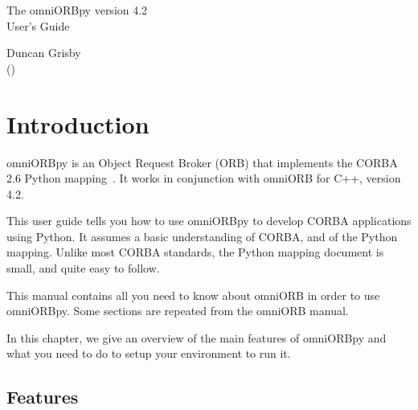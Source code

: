 \documentclass[11pt,oneside,a4paper]{book}
\begin{document}
\pagestyle{empty}


\begin{center}

\vfill

{ \Huge
The omniORBpy version 4.2\\[4mm]
User's Guide
}

\vfill

{ \Large
Duncan Grisby\\
{\normalsize (\textit{\href{mailto:dgrisby@apasphere.com}%
                           {}})}%
                           \\[2ex]
}

\vfill

\end{center}

\cleardoublepage

\tableofcontents

\cleardoublepage

\pagestyle{headings}


\mainmatter


\chapter{Introduction}

omniORBpy is an Object Request Broker (ORB) that implements the CORBA
2.6 Python mapping~\cite{pythonmapping}. It works in conjunction with
omniORB for C++, version 4.2.

This user guide tells you how to use omniORBpy to develop CORBA
applications using Python. It assumes a basic understanding of CORBA,
and of the Python mapping. Unlike most CORBA standards, the Python
mapping document is small, and quite easy to follow.

This manual contains all you need to know about omniORB in order to
use omniORBpy. Some sections are repeated from the omniORB manual.

In this chapter, we give an overview of the main features of omniORBpy
and what you need to do to setup your environment to run it.

\section{Features}
\end{document}
